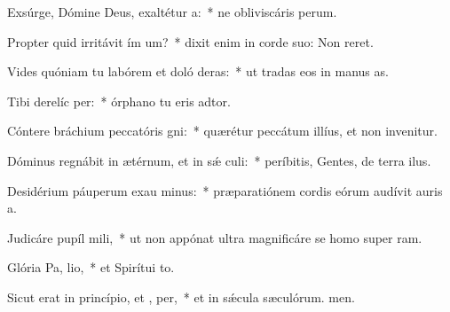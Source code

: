 \item Exsúrge, Dómine Deus, exaltétur  a:~* ne obliviscáris perum.
\item Propter quid irritávit ím um?~* dixit enim in corde suo: Non reret.
\item Vides quóniam tu labórem et doló deras:~* ut tradas eos in manus as.
\item Tibi derelíc  per:~* órphano tu eris adtor.
\item Cóntere bráchium peccatóris  gni:~* quærétur peccátum illíus, et non invenitur.
\item Dóminus regnábit in ætérnum, et in sǽ culi:~* períbitis, Gentes, de terra ilus.
\item Desidérium páuperum exau minus:~* præparatiónem cordis eórum audívit auris a.
\item Judicáre pupíl  mili,~* ut non appónat ultra magnificáre se homo super ram.
\item Glória Pa,  lio,~* et Spirítui to.
\item Sicut erat in princípio, et ,  per,~* et in sǽcula sæculórum. men.

